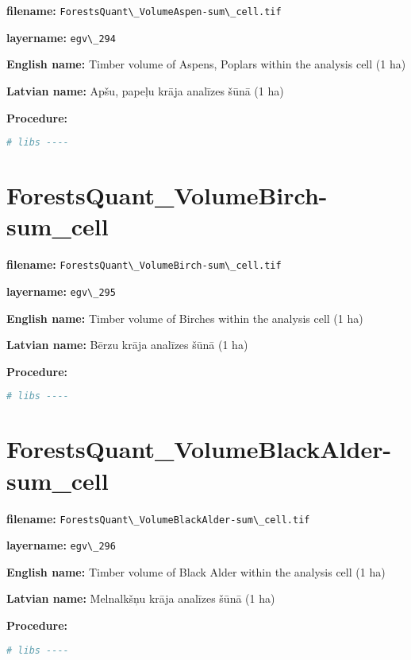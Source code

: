 \documentclass[
]{book}
\newcommand{\passthrough}[1]{#1}
\begin{document}
\textbf{filename:} \passthrough{\lstinline!ForestsQuant\_VolumeAspen-sum\_cell.tif!}

\textbf{layername:} \passthrough{\lstinline!egv\_294!}

\textbf{English name:} Timber volume of Aspens, Poplars within the analysis cell (1 ha)

\textbf{Latvian name:} Apšu, papeļu krāja analīzes šūnā (1 ha)

\textbf{Procedure:}

\begin{lstlisting}[language=R]
# libs ----
\end{lstlisting}

\section{ForestsQuant\_VolumeBirch-sum\_cell}\label{ch06.295}

\textbf{filename:} \passthrough{\lstinline!ForestsQuant\_VolumeBirch-sum\_cell.tif!}

\textbf{layername:} \passthrough{\lstinline!egv\_295!}

\textbf{English name:} Timber volume of Birches within the analysis cell (1 ha)

\textbf{Latvian name:} Bērzu krāja analīzes šūnā (1 ha)

\textbf{Procedure:}

\begin{lstlisting}[language=R]
# libs ----
\end{lstlisting}

\section{ForestsQuant\_VolumeBlackAlder-sum\_cell}\label{ch06.296}

\textbf{filename:} \passthrough{\lstinline!ForestsQuant\_VolumeBlackAlder-sum\_cell.tif!}

\textbf{layername:} \passthrough{\lstinline!egv\_296!}

\textbf{English name:} Timber volume of Black Alder within the analysis cell (1 ha)

\textbf{Latvian name:} Melnalkšņu krāja analīzes šūnā (1 ha)

\textbf{Procedure:}

\begin{lstlisting}[language=R]
# libs ----
\end{lstlisting}
\end{document}

